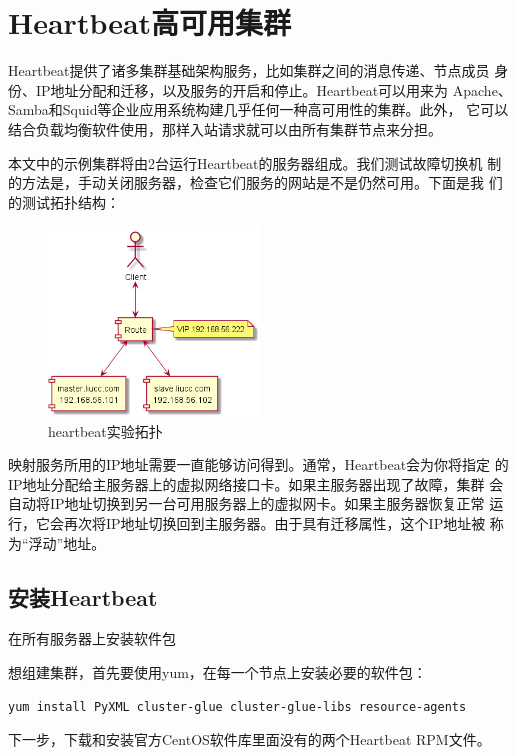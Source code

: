\chapter{Heartbeat高可用集群}

Heartbeat提供了诸多集群基础架构服务，比如集群之间的消息传递、节点成员
身份、IP地址分配和迁移，以及服务的开启和停止。Heartbeat可以用来为
Apache、Samba和Squid等企业应用系统构建几乎任何一种高可用性的集群。此外，
它可以结合负载均衡软件使用，那样入站请求就可以由所有集群节点来分担。

本文中的示例集群将由2台运行Heartbeat的服务器组成。我们测试故障切换机
制的方法是，手动关闭服务器，检查它们服务的网站是不是仍然可用。下面是我
们的测试拓扑结构：

\begin{figure}[!htbp]
  \centering
  \includegraphics[width=0.5\textwidth]{img/heartbeat.png}
  \caption{heartbeat实验拓扑}
\end{figure}

映射服务所用的IP地址需要一直能够访问得到。通常，Heartbeat会为你将指定
的IP地址分配给主服务器上的虚拟网络接口卡。如果主服务器出现了故障，集群
会自动将IP地址切换到另一台可用服务器上的虚拟网卡。如果主服务器恢复正常
运行，它会再次将IP地址切换回到主服务器。由于具有迁移属性，这个IP地址被
称为“浮动”地址。

\section{安装Heartbeat}

在所有服务器上安装软件包

想组建集群，首先要使用yum，在每一个节点上安装必要的软件包：

\begin{verbatim}
yum install PyXML cluster-glue cluster-glue-libs resource-agents
\end{verbatim}

下一步，下载和安装官方CentOS软件库里面没有的两个Heartbeat RPM文件。

